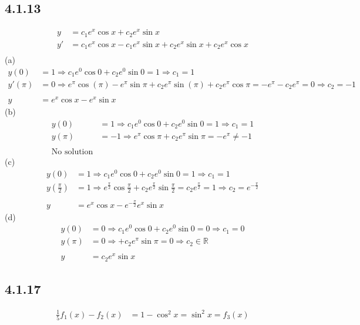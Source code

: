 \documentclass{article}
\begin{document}
\subsection{4.1.13}
\begin{align*}
    y &= c_1e^{x}\cos x+c_2e^{x}\sin x\\
    y' &= c_1e^{x}\cos x-c_1e^{x}\sin x+c_2e^{x}\sin x+c_2e^{x}\cos x\\
\end{align*}
(a)
\begin{align*}
    y(0) &= 1 \Rightarrow c_1e^{0}\cos 0+c_2e^{0}\sin 0  = 1 \Rightarrow c_1  = 1\\
    y'(\pi) &= 0 \Rightarrow e^{\pi}\cos (\pi)-e^{\pi}\sin \pi + c_2e^{\pi}\sin (\pi)+c_2e^{\pi}\cos \pi  = -e^{\pi}-c_2e^{\pi} = 0 \Rightarrow c_2 = -1\\\\
    y &= e^{x}\cos x-e^{x}\sin x
\end{align*}
(b)
\begin{align*}
    y(0) &= 1 \Rightarrow c_1e^{0}\cos 0+c_2e^{0}\sin 0  = 1 \Rightarrow c_1  = 1\\
    y(\pi)  &= -1 \Rightarrow e^{\pi}\cos \pi +c_2e^{\pi}\sin \pi  = -e^{\pi} \neq -1\\\\
    \text{No solution}
\end{align*}
(c)
\begin{align*}
    y(0) &= 1 \Rightarrow c_1e^{0}\cos 0+c_2e^{0}\sin 0  = 1 \Rightarrow c_1  = 1\\
    y\left(\frac{\pi}{2}\right)  &= 1 \Rightarrow e^{\frac{\pi}{2}}\cos \frac{\pi}{2} +c_2e^{\frac{\pi}{2}}\sin \frac{\pi}{2} = c_2e^{\frac{\pi}{2}} = 1 \Rightarrow c_2 = e^{-\frac{\pi}{2}}\\\\
    y &= e^{x}\cos x-e^{-\frac{\pi}{2}}e^{x}\sin x
\end{align*}
(d)
\begin{align*}
    y(0) &= 0 \Rightarrow c_1e^{0}\cos 0+c_2e^{0}\sin 0  = 0 \Rightarrow c_1  = 0\\
    y(\pi)  &= 0 \Rightarrow  +c_2e^{\pi}\sin \pi  = 0 \Rightarrow c_2 \in \mathbb{R} \\\\
    y &= c_2e^{x}\sin x
\end{align*}

\subsection{4.1.17}
\begin{align*}
    \frac{1}{5}f_1(x)-f_2(x) &= 1-\cos ^2x = \sin ^2x = f_3(x)
\end{align*}
\end{document}
